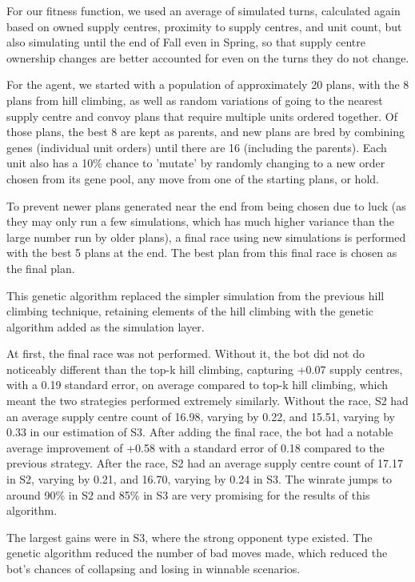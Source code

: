 \documentclass[12pt,a4paper]{article}
\begin{document}
For our fitness function, we used an average of simulated turns, calculated again based on owned supply centres, proximity to supply centres, and unit count, but also simulating until the end of Fall even in Spring, so that supply centre ownership changes are better accounted for even on the turns they do not change.

For the agent, we started with a population of approximately 20 plans, with the 8 plans from hill climbing, as well as random variations of going to the nearest supply centre and convoy plans that require multiple units ordered together.
Of those plans, the best 8 are kept as parents, and new plans are bred by combining genes (individual unit orders) until there are 16 (including the parents). Each unit also has a 10\% chance to 
'mutate' by randomly changing to a new order chosen from its gene pool, any move from one of the starting plans, or hold.

To prevent newer plans generated near the end from being chosen due to luck (as they may only run a few simulations, which has much higher variance than the large number run by older plans), a final race using new simulations is performed with the best 5 plans at the end.
The best plan from this final race is chosen as the final plan.

This genetic algorithm replaced the simpler simulation from the previous hill climbing technique, retaining elements of the hill climbing with the genetic algorithm added as the simulation layer.

At first, the final race was not performed. Without it, the bot did not do noticeably different than the top-k hill climbing, capturing +0.07 supply centres, with a 0.19 standard error, on average compared to top-k hill climbing,
which meant the two strategies performed extremely similarly.
Without the race, S2 had an average supply centre count of 16.98, varying by 0.22, and 15.51, varying by 0.33 in our estimation of S3. 
After adding the final race, the bot had a notable average improvement of +0.58 with a standard error of 0.18 compared to the previous strategy.
After the race, S2 had an average supply centre count of 17.17 in S2, varying by 0.21, and 16.70, varying by 0.24 in S3. The winrate jumps to around 90\% in S2 and 85\% in S3 are very promising for the results of this algorithm.

The largest gains were in S3, where the strong opponent type existed. The genetic algorithm reduced the number of bad moves made, which reduced the bot's chances of collapsing and losing in winnable scenarios.
\end{document}
